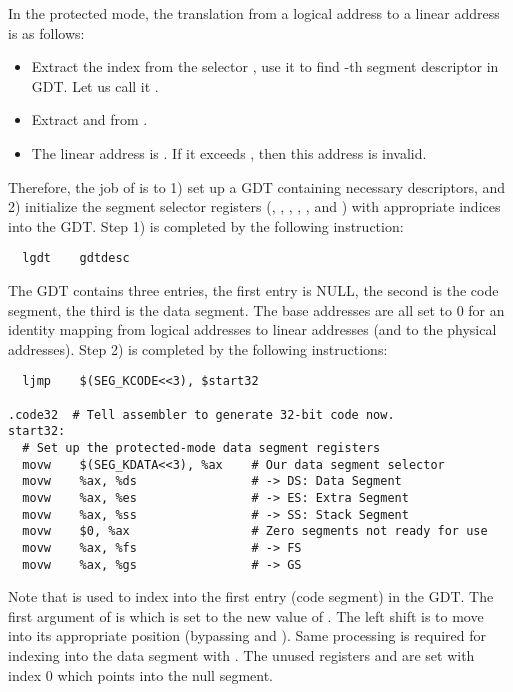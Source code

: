\documentclass{article}
\begin{document}
In the protected mode, the translation from a logical address
 to a linear address is as follows:
%
\begin{itemize}
\item Extract the index  from the selector , use
  it to find -th segment descriptor in GDT. Let us call it
  .

\item Extract  and  from .

\item The linear address is . If it exceeds
  , then this address is invalid.
\end{itemize}
%
Therefore, the job of  is to 1) set up a GDT containing
necessary descriptors, and 2) initialize the segment selector
registers (, , , ,
, and ) with appropriate indices into the GDT.
%
Step 1) is completed by the following instruction:
%
\begin{verbatim}
  lgdt    gdtdesc
\end{verbatim}
%
The GDT contains three entries, the first entry is NULL, the second is
the code segment, the third is the data segment. The base addresses
are all set to $0$ for an identity mapping from logical addresses to
linear addresses (and to the physical addresses).
%
Step 2) is completed by the following instructions:
%
\begin{verbatim}
  ljmp    $(SEG_KCODE<<3), $start32

.code32  # Tell assembler to generate 32-bit code now.
start32:
  # Set up the protected-mode data segment registers
  movw    $(SEG_KDATA<<3), %ax    # Our data segment selector
  movw    %ax, %ds                # -> DS: Data Segment
  movw    %ax, %es                # -> ES: Extra Segment
  movw    %ax, %ss                # -> SS: Stack Segment
  movw    $0, %ax                 # Zero segments not ready for use
  movw    %ax, %fs                # -> FS
  movw    %ax, %gs                # -> GS
\end{verbatim}
%
Note that  is used to index into the first entry
(code segment) in the GDT. The first argument of  is
 which is set to the new value of
. The left shift is to move  into its
appropriate position (bypassing  and ). Same
processing is required for indexing into the data segment with
. The unused registers  and 
are set with index $0$ which points into the null segment.
\end{document}

